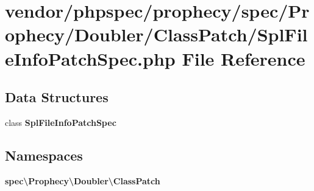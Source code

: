 \section{vendor/phpspec/prophecy/spec/\+Prophecy/\+Doubler/\+Class\+Patch/\+Spl\+File\+Info\+Patch\+Spec.php File Reference}
\label{_spl_file_info_patch_spec_8php}
\subsection*{Data Structures}
\begin{DoxyCompactItemize}
\item 
class {\bf Spl\+File\+Info\+Patch\+Spec}
\end{DoxyCompactItemize}
\subsection*{Namespaces}
\begin{DoxyCompactItemize}
\item 
 {\bf spec\textbackslash{}\+Prophecy\textbackslash{}\+Doubler\textbackslash{}\+Class\+Patch}
\end{DoxyCompactItemize}
